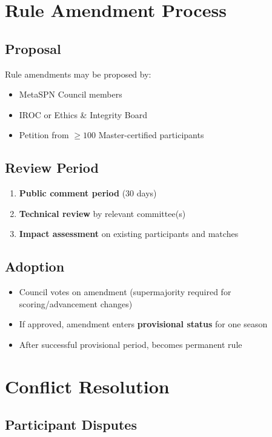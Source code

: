 \section{Rule Amendment Process}

\subsection{Proposal}

Rule amendments may be proposed by:
\begin{itemize}[leftmargin=*]
  \item MetaSPN Council members
  \item IROC or Ethics \& Integrity Board
  \item Petition from $\geq 100$ Master-certified participants
\end{itemize}

\subsection{Review Period}

\begin{enumerate}
  \item \textbf{Public comment period} (30 days)
  \item \textbf{Technical review} by relevant committee(s)
  \item \textbf{Impact assessment} on existing participants and matches
\end{enumerate}

\subsection{Adoption}

\begin{itemize}[leftmargin=*]
  \item Council votes on amendment (supermajority required for scoring/advancement changes)
  \item If approved, amendment enters \textbf{provisional status} for one season
  \item After successful provisional period, becomes permanent rule
\end{itemize}

\section{Conflict Resolution}

\subsection{Participant Disputes}

